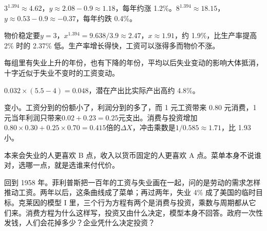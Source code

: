 \begin{answers}
\item $3^{1.394}\approx4.62$，$y\approx2.08-0.9\approx1.18$，每年约涨 1.2\%。$8^{1.394}\approx18.15$，$y\approx0.53-0.9\approx-0.37$，每年约跌 0.4\%。
\item 物价稳定要$y=3$，$x^{1.394}=9.638/3.9\approx2.47$，$x\approx1.91$，约 1.9\%，比生产率提高 2\% 时的 2.37\% 低。生产率增长得快，工资可以涨得多而物价不涨。
\item 每组里有失业上升的年份，也有下降的年份，平均以后失业变动的影响大体抵消，十字近似于失业不变时的工资变动。
\item $0.032\times(5.5-4)=0.048$，潜在产出比实际产出高约 4.8\%。
\item 变小。工资分到的份额小了，利润分到的多了，而 1 元工资带来 0.80 元消费，1 元当年利润只带来$0.02+0.23=0.25$元支出。消费与投资增加$0.80\times0.30+0.25\times0.70=0.415$倍的$\Delta X$，冲击乘数是$1/0.585\approx1.71$，比 1.93 小。
\item 本来会失业的人更喜欢 B 点，收入以货币固定的人更喜欢 A 点。菜单本身不说谁对，选哪一点，就是选谁来付代价。
\end{answers}

回到 1958 年。菲利普斯把一百年的工资与失业画在一起，问的是劳动的需求怎样推动工资\cite{phillips1958}。两年以后，这条曲线成了菜单；再过两年，失业 4\% 成了美国的临时目标\cite{samuelson1960,erp1962}。克莱因的模型 I 里，三个行为方程有两个是消费与投资，乘数与周期都从它们来。消费方程为什么这样写，投资又由什么决定，模型本身不回答。政府一次性发钱，人们会花掉多少？企业凭什么决定投资？
